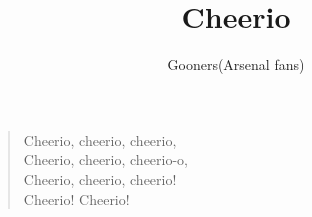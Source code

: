 \documentclass[a4paper,12pt]{article}
\title{Cheerio}
\author{Gooners(Arsenal fans)}
\date{}
\begin{document}
	
	\maketitle
	
	\begin{verse}
		
		Cheerio, cheerio, cheerio, \\
		Cheerio, cheerio, cheerio-o, \\
		Cheerio, cheerio, cheerio! \\
		Cheerio! Cheerio!
		
	\end{verse}
	
\end{document}
